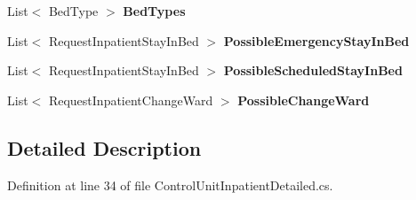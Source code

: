 \begin{DoxyCompactItemize}
\item 
List$<$ Bed\+Type $>$ {\bfseries Bed\+Types}\hypertarget{class_general_health_elements_1_1_inpatient_1_1_control_units_1_1_control_unit_inpatient_detailed_a4509a2c0286890d0ea44a5b4e3975fc3}{}\label{class_general_health_elements_1_1_inpatient_1_1_control_units_1_1_control_unit_inpatient_detailed_a4509a2c0286890d0ea44a5b4e3975fc3}

\item 
List$<$ Request\+Inpatient\+Stay\+In\+Bed $>$ {\bfseries Possible\+Emergency\+Stay\+In\+Bed}\hypertarget{class_general_health_elements_1_1_inpatient_1_1_control_units_1_1_control_unit_inpatient_detailed_a8f09d929f4a20703b92b96e78a46079a}{}\label{class_general_health_elements_1_1_inpatient_1_1_control_units_1_1_control_unit_inpatient_detailed_a8f09d929f4a20703b92b96e78a46079a}

\item 
List$<$ Request\+Inpatient\+Stay\+In\+Bed $>$ {\bfseries Possible\+Scheduled\+Stay\+In\+Bed}\hypertarget{class_general_health_elements_1_1_inpatient_1_1_control_units_1_1_control_unit_inpatient_detailed_a96443ca49ad61018045938e49bdd74cf}{}\label{class_general_health_elements_1_1_inpatient_1_1_control_units_1_1_control_unit_inpatient_detailed_a96443ca49ad61018045938e49bdd74cf}

\item 
List$<$ Request\+Inpatient\+Change\+Ward $>$ {\bfseries Possible\+Change\+Ward}\hypertarget{class_general_health_elements_1_1_inpatient_1_1_control_units_1_1_control_unit_inpatient_detailed_ad0d6527d36b82aa0326f7d49e182cec4}{}\label{class_general_health_elements_1_1_inpatient_1_1_control_units_1_1_control_unit_inpatient_detailed_ad0d6527d36b82aa0326f7d49e182cec4}

\end{DoxyCompactItemize}


\subsection{Detailed Description}


Definition at line 34 of file Control\+Unit\+Inpatient\+Detailed.\+cs.

